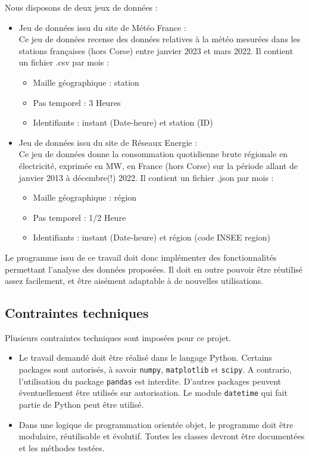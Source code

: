 \documentclass[11pt]{article}
\begin{document}
Nous disposons de deux jeux de données :
\begin{itemize}[label=, font=\large]
    \item Jeu de données issu du site de Météo France :\\
    Ce jeu de données recense des données relatives à la météo mesurées dans les stations françaises (hors Corse) entre janvier 2023 et mars 2022. Il contient un fichier .csv par mois :
        \begin{itemize}
            \item Maille géographique : station
            \item Pas temporel : 3 Heures
            \item Identifiants : instant (Date-heure) et station (ID) 
        \end{itemize}
    \item Jeu de données issu du site de Réseaux Energie :\\
    Ce jeu de données donne la consommation quotidienne brute régionale en électricité, exprimée en MW, en France (hors Corse) sur la période allant de janvier 2013 à décembre(!) 2022. Il contient un fichier .json par mois :
    \begin{itemize}
        \item Maille géographique : région
        \item Pas temporel : 1/2 Heure
        \item Identifiants : instant (Date-heure) et région (code INSEE region)
    \end{itemize}
\end{itemize}
Le programme issu de ce travail doit donc implémenter des fonctionnalités permettant l’analyse des données proposées. Il doit en outre pouvoir être réutilisé assez facilement, et être aisément adaptable à de nouvelles utilisations.

\subsection{Contraintes techniques}

Plusieurs contraintes techniques sont imposées pour ce projet.
\begin{itemize}
    \item Le travail demandé doit être réalisé dans le langage Python. Certains packages sont autorisés, à savoir \texttt{numpy}, \texttt{matplotlib} et \texttt{scipy}. A contrario, l’utilisation du package \texttt{pandas} est interdite. D’autres packages peuvent éventuellement être utilisés sur autorisation. Le module \texttt{datetime} qui fait partie de Python peut être utilisé.
    \item  Dans une logique de programmation orientée objet, le programme doit être modulaire, réutilisable et évolutif. Toutes les classes devront être documentées et les méthodes testées.
\end{itemize}
    
\end{document}
